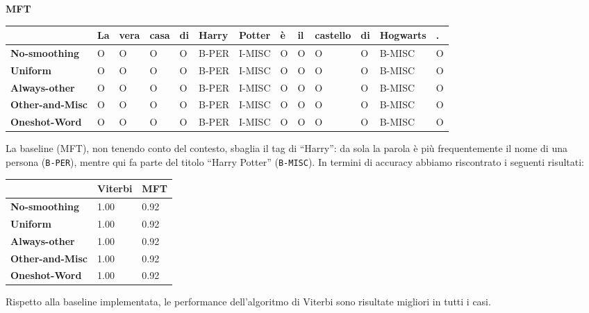 \documentclass[a4paper,11pt,notitlepage]{report}
\begin{document}
\begin{center}\textbf{MFT}\end{center}
\begin{center}
\scriptsize
\setlength{\tabcolsep}{3pt}
\begin{tabular}{|l|l|l|l|l|l|l|l|l|l|l|l|l|}
\hline
\textbf{} & \textbf{La} & \textbf{vera} & \textbf{casa} & \textbf{di} & \textbf{Harry} & \textbf{Potter} & \textbf{è} & \textbf{il} & \textbf{castello} & \textbf{di} & \textbf{Hogwarts} & \textbf{.} \\ \hline
\textbf{No-smoothing} & O & O & O & O & B-PER & I-MISC & O & O & O & O & B-MISC & O \\ \hline
\textbf{Uniform} & O & O & O & O & B-PER & I-MISC & O & O & O & O & B-MISC & O \\ \hline
\textbf{Always-other} & O & O & O & O & B-PER & I-MISC & O & O & O & O & B-MISC & O \\ \hline
\textbf{Other-and-Misc} & O & O & O & O & B-PER & I-MISC & O & O & O & O & B-MISC & O \\ \hline
\textbf{Oneshot-Word} & O & O & O & O & B-PER & I-MISC & O & O & O & O & B-MISC & O \\ \hline
\end{tabular}
\end{center}

La baseline (MFT), non tenendo conto del contesto, sbaglia il tag di ``Harry'': da sola la parola è più frequentemente il nome di una persona (\texttt{B-PER}), mentre qui fa parte del titolo ``Harry Potter'' (\texttt{B-MISC}).
In termini di accuracy abbiamo riscontrato i seguenti risultati:

\begin{center}
\small
\setlength{\tabcolsep}{3pt}
\begin{tabular}{|l|l|l|}
\hline
\textbf{} & \textbf{Viterbi} & \textbf{MFT} \\ \hline
\textbf{No-smoothing} & 1.00 & 0.92 \\ \hline
\textbf{Uniform} & 1.00 & 0.92 \\ \hline
\textbf{Always-other} & 1.00 & 0.92 \\ \hline
\textbf{Other-and-Misc} & 1.00 & 0.92 \\ \hline
\textbf{Oneshot-Word} & 1.00 & 0.92 \\ \hline
\end{tabular}
\end{center}

Rispetto alla baseline implementata, le performance dell'algoritmo di Viterbi sono risultate migliori in tutti i casi.
\end{document}
